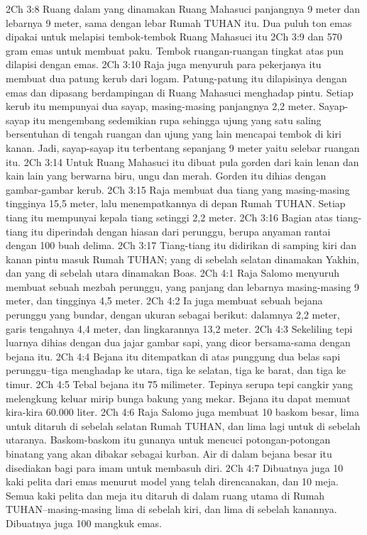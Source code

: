 2Ch 3:8  Ruang dalam yang dinamakan Ruang Mahasuci panjangnya 9 meter dan lebarnya 9 meter, sama dengan lebar Rumah TUHAN itu. Dua puluh ton emas dipakai untuk melapisi tembok-tembok Ruang Mahasuci itu
2Ch 3:9  dan 570 gram emas untuk membuat paku. Tembok ruangan-ruangan tingkat atas pun dilapisi dengan emas.
2Ch 3:10  Raja juga menyuruh para pekerjanya itu membuat dua patung kerub dari logam. Patung-patung itu dilapisinya dengan emas dan dipasang berdampingan di Ruang Mahasuci menghadap pintu. Setiap kerub itu mempunyai dua sayap, masing-masing panjangnya 2,2 meter. Sayap-sayap itu mengembang sedemikian rupa sehingga ujung yang satu saling bersentuhan di tengah ruangan dan ujung yang lain mencapai tembok di kiri kanan. Jadi, sayap-sayap itu terbentang sepanjang 9 meter yaitu selebar ruangan itu.
2Ch 3:14  Untuk Ruang Mahasuci itu dibuat pula gorden dari kain lenan dan kain lain yang berwarna biru, ungu dan merah. Gorden itu dihias dengan gambar-gambar kerub.
2Ch 3:15  Raja membuat dua tiang yang masing-masing tingginya 15,5 meter, lalu menempatkannya di depan Rumah TUHAN. Setiap tiang itu mempunyai kepala tiang setinggi 2,2 meter.
2Ch 3:16  Bagian atas tiang-tiang itu diperindah dengan hiasan dari perunggu, berupa anyaman rantai dengan 100 buah delima.
2Ch 3:17  Tiang-tiang itu didirikan di samping kiri dan kanan pintu masuk Rumah TUHAN; yang di sebelah selatan dinamakan Yakhin, dan yang di sebelah utara dinamakan Boas.
2Ch 4:1  Raja Salomo menyuruh membuat sebuah mezbah perunggu, yang panjang dan lebarnya masing-masing 9 meter, dan tingginya 4,5 meter.
2Ch 4:2  Ia juga membuat sebuah bejana perunggu yang bundar, dengan ukuran sebagai berikut: dalamnya 2,2 meter, garis tengahnya 4,4 meter, dan lingkarannya 13,2 meter.
2Ch 4:3  Sekeliling tepi luarnya dihias dengan dua jajar gambar sapi, yang dicor bersama-sama dengan bejana itu.
2Ch 4:4  Bejana itu ditempatkan di atas punggung dua belas sapi perunggu--tiga menghadap ke utara, tiga ke selatan, tiga ke barat, dan tiga ke timur.
2Ch 4:5  Tebal bejana itu 75 milimeter. Tepinya serupa tepi cangkir yang melengkung keluar mirip bunga bakung yang mekar. Bejana itu dapat memuat kira-kira 60.000 liter.
2Ch 4:6  Raja Salomo juga membuat 10 baskom besar, lima untuk ditaruh di sebelah selatan Rumah TUHAN, dan lima lagi untuk di sebelah utaranya. Baskom-baskom itu gunanya untuk mencuci potongan-potongan binatang yang akan dibakar sebagai kurban. Air di dalam bejana besar itu disediakan bagi para imam untuk membasuh diri.
2Ch 4:7  Dibuatnya juga 10 kaki pelita dari emas menurut model yang telah direncanakan, dan 10 meja. Semua kaki pelita dan meja itu ditaruh di dalam ruang utama di Rumah TUHAN--masing-masing lima di sebelah kiri, dan lima di sebelah kanannya. Dibuatnya juga 100 mangkuk emas.
